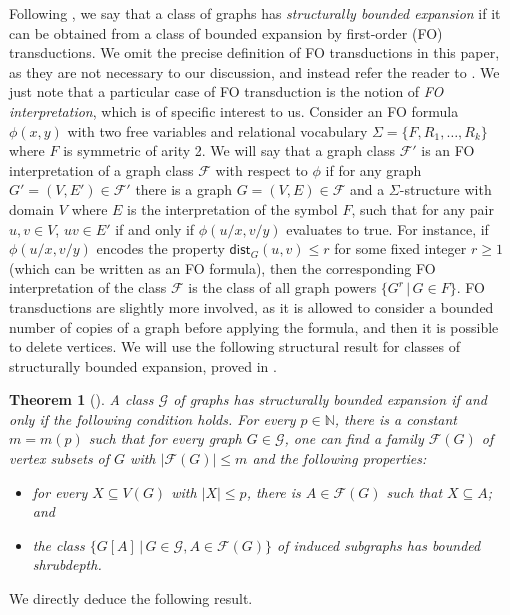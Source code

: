 \documentclass[11pt]{article}
\newtheorem{thm}{Theorem}[section]
\theoremstyle{definition}
\renewcommand{\le}{\leqslant}
\renewcommand{\leq}{\leqslant}
\renewcommand{\ge}{\geqslant}
\def\F {{\mathcal F}}
\newcommand{\dist}{\mathsf{dist}}
\begin{document}
Following \cite{GKN+20}, we say that a class of graphs has \emph{structurally bounded expansion} if
it can be obtained from a class of bounded expansion by first-order
(FO) transductions. We omit the precise definition of FO transductions
in this paper, as they are not necessary to our discussion, and instead
refer the reader to \cite{GKN+20}. We just note that a particular case of
FO transduction is the notion of \emph{FO interpretation}, which is of
specific interest to us. Consider an FO formula $\phi(x,y)$ with two free variables and relational vocabulary $\Sigma = \{ F,
R_1, \dotsc, R_k \}$ where $F$ is symmetric of arity 2. We will say
that a graph class $\F'$ is an FO interpretation of a graph class $\F$
with respect to $\phi$
if for any graph $G'=(V,E')\in \F'$ there is a graph $G=(V,E)\in \F$ and a $\Sigma$-structure with domain $V$ where $E$ is the interpretation of the
symbol $F$, such that for any pair $u,v\in V$, $uv\in E'$ if and only
if $\phi(u / x, v / y)$ evaluates to true. For instance, if
$\phi(u/x,v/y)$ encodes the property  $\dist_G(u,v)\le r$ for some fixed
integer $r\ge 1$ (which can
be written as an FO formula), then the corresponding FO interpretation of the class
$\F$ is the class of all graph powers $\{G^r\,|\, G\in F\}$. FO
transductions are slightly more involved, as it is allowed to consider
a bounded number of copies of a graph before applying the formula, and
then it is possible to delete vertices. We will use
the following structural result for classes of structurally bounded expansion, proved in
\cite{GKN+20}.

\begin{thm}[\cite{GKN+20}]\label{thm:gkn+20}
 A class $\mathcal{G}$ of graphs  has structurally bounded expansion if and only if the following condition holds.
  For every $p\in \mathbb{N}$, there is a constant $m=m(p)$ such that for every graph $G\in \mathcal{G}$, one can find a family $\mathcal{F}(G)$ of vertex subsets of $G$ with $|\mathcal{F}(G)|\leq m$ and the following properties:
 \begin{itemize}
  \item for every $X\subseteq V(G)$ with $|X|\leq p$, there is $A\in \mathcal{F}(G)$ such that $X\subseteq A$; and
  \item the class $\{G[A]\,|\, G\in \mathcal{G}, A\in \mathcal{F}(G)\}$ of induced subgraphs has bounded shrubdepth.
 \end{itemize}
\end{thm}

We directly deduce the following result.
\end{document}
